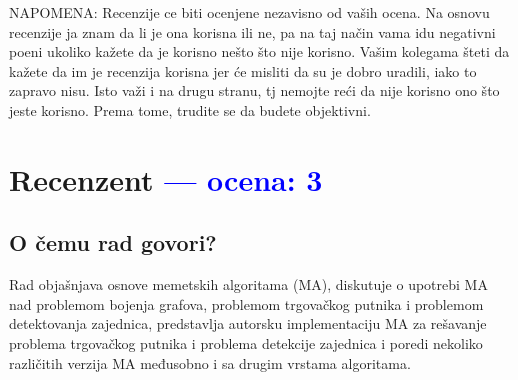 \documentclass[a4paper]{report}
\newcommand{\odgovor}[1]{\textcolor{blue}{#1}}
\begin{document}
NAPOMENA: Recenzije ce biti ocenjene nezavisno od vaših ocena. Na osnovu recenzije ja znam da li je ona korisna ili ne, pa na taj način vama idu negativni poeni ukoliko kažete
 da je korisno nešto što nije korisno. Vašim kolegama šteti da kažete da im je recenzija korisna jer će misliti da su je dobro uradili, iako to zapravo nisu. Isto važi i na 
 drugu stranu, tj nemojte reći da nije korisno ono što jeste korisno. Prema tome, trudite se da budete objektivni. 
 
 
 
 \chapter{Recenzent \odgovor{--- ocena: 3} }


\section{O čemu rad govori?}
Rad objašnjava osnove memetskih algoritama (MA), diskutuje o upotrebi MA nad problemom bojenja grafova, problemom trgovačkog putnika i problemom detektovanja zajednica,
 predstavlja autorsku implementaciju MA za rešavanje problema trgovačkog putnika i problema detekcije zajednica i poredi nekoliko različitih verzija MA međusobno i sa drugim
 vrstama algoritama. 
\end{document}
